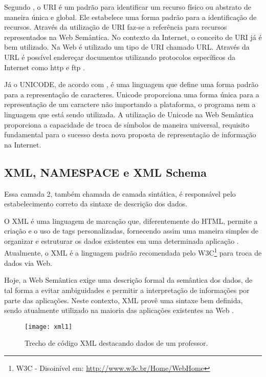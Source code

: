 Segundo \cite{elementoswebsem}, o URI é um padrão para identificar um recurso físico ou abstrato de maneira única e global. Ele estabelece uma forma padrão para a identificação de recursos. Através da utilização de URI faz-se a referência para recursos representados na Web Semântica. No contexto da Internet, o conceito de URI já é bem utilizado. Na Web é utilizado um tipo de URI chamado URL. Através da URL é possível endereçar documentos utilizando protocolos específicos da Internet como http e ftp \cite{rosa}.

Já o UNICODE, de acordo com \cite{rosa}, é uma linguagem que define uma forma padrão para a representação de caracteres. Unicode proporciona uma forma única para a representação de um caractere não importando a plataforma, o programa nem a linguagem que está sendo utilizada. A utilização de Unicode na Web Semântica proporciona a capacidade de troca de símbolos de maneira universal, requisito fundamental para o sucesso desta nova proposta de representação de informação na Internet. 

\subsection{XML, NAMESPACE e XML Schema}

Essa camada 2, também chamada de camada sintática, é responsável pelo estabelecimento correto da sintaxe de descrição dos dados.

O XML é uma linguagem de marcação que, diferentemente do HTML, permite a criação e o uso de tags personalizadas, fornecendo assim uma maneira simples de organizar e estruturar os dados existentes em uma determinada aplicação \cite{XML2009}. Atualmente, o XML é a linguagem padrão recomendada pelo W3C\footnote{W3C - Disoinível em: \url{http://www.w3c.br/Home/WebHome}} para troca de dados via Web.

Hoje, a Web Semântica exige uma descrição formal da semântica dos dados, de tal forma a evitar ambiguidades e permitir a interpretação de informações por parte das aplicações. Neste contexto, XML provê uma sintaxe bem definida, sendo atualmente utilizado na maioria das aplicações existentes na Web \cite{filholoscio}.

\graphicspath{{figuras/}}
\begin{figure}[H]
\centering
\texttt{[image: xml1]}
\caption{Trecho de código XML destacando dados de um professor.}
\label{xml1}
\end{figure}

